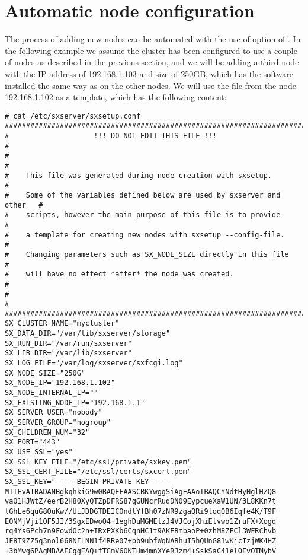 \section{Automatic node configuration} \label{sec:configfile}
The process of adding new nodes can be automated with the use of
 option of . In the following example
we assume the cluster has been configured to use a couple of nodes as
described in the previous section, and we will be adding a third node
with the IP address of 192.168.1.103 and size of 250GB, which has the \SX
software installed the same way as on the other nodes. We will use the
 file from the node 192.168.1.102 as a template, which
has the following content:
\begin{lstlisting}
# cat /etc/sxserver/sxsetup.conf
###########################################################################
#                    !!! DO NOT EDIT THIS FILE !!!                        #
#                                                                         #
#    This file was generated during node creation with sxsetup.           #
#    Some of the variables defined below are used by sxserver and other   #
#    scripts, however the main purpose of this file is to provide         #
#    a template for creating new nodes with sxsetup --config-file.        #
#    Changing parameters such as SX_NODE_SIZE directly in this file       #
#    will have no effect *after* the node was created.                    #
#                                                                         #
###########################################################################
SX_CLUSTER_NAME="mycluster"
SX_DATA_DIR="/var/lib/sxserver/storage"
SX_RUN_DIR="/var/run/sxserver"
SX_LIB_DIR="/var/lib/sxserver"
SX_LOG_FILE="/var/log/sxserver/sxfcgi.log"
SX_NODE_SIZE="250G"
SX_NODE_IP="192.168.1.102"
SX_NODE_INTERNAL_IP=""
SX_EXISTING_NODE_IP="192.168.1.1"
SX_SERVER_USER="nobody"
SX_SERVER_GROUP="nogroup"
SX_CHILDREN_NUM="32"
SX_PORT="443"
SX_USE_SSL="yes"
SX_SSL_KEY_FILE="/etc/ssl/private/sxkey.pem"
SX_SSL_CERT_FILE="/etc/ssl/certs/sxcert.pem"
SX_SSL_KEY="-----BEGIN PRIVATE KEY-----
MIIEvAIBADANBgkqhkiG9w0BAQEFAASCBKYwggSiAgEAAoIBAQCYNdtHyNglHZQ8
vaO1HJWtZ/eerB2H80XyQTZpDFRS87qGUNcrRudDN09EypcueXaW1UN/3L8KKn7t
tGhLe6quG8QuKw//UiJDDGTDEICOndtYfBh07zNR9zgaQRi9loqQB6Iqfe4K/T9F
EONMjVji1OF5JI/3SgxEDwoQ4+1eghDuMGMElzJ4VJCojXhiEtvwo1ZruFX+Xogd
rq4Ys6Pch7n9FowdOc2n+IRxPXKb6CqnHC1t9AKEBmbaoP+0zhM8ZFCl3WFRChvb
JF8T9ZZ5q3nol668NILNN1f4RRe07+pb9ubfWqNABhuI5hQUnG81wKjcIzjWK4HZ
+3bMwg6PAgMBAAECggEAQ+fTGmV6OKTHm4mnXYeRJzm4+SskSaC41elOEvOTMybV

\end{lstlisting}
